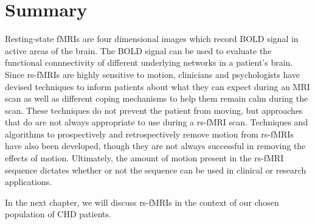 \section{Summary}

Resting-state fMRIs are four dimensional images which record BOLD signal in active areas of the brain. The BOLD signal can be used to evaluate the functional connnectivity of different underlying networks in a patient's brain. Since rs-fMRIs are highly sensitive to motion, clinicians and psychologists have devised techniques to inform patients about what they can expect during an MRI scan as well as different coping mechanisms to help them remain calm during the scan. These techniques do not prevent the patient from moving, but approaches that do are not always appropriate to use during a rs-fMRI scan. Techniques and algorithms to prospectively and retrospectively remove motion from rs-fMRIs have also been developed, though they are not always successful in removing the effects of motion. Ultimately, the amount of motion present in the rs-fMRI sequence dictates whether or not the sequence can be used in clinical or research applications.

In the next chapter, we will discuss rs-fMRIs in the context of our chosen population of CHD patients.